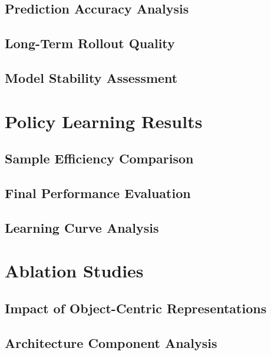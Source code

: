 \documentclass[
	english,
	ruledheaders=section,
	class=report,
	thesis={type=master},
	accentcolor=9c,
	custommargins=true,
	marginpar=false,
	parskip=half-,
	fontsize=11pt,
]{tudapub}
\begin{document}
\subsection{Prediction Accuracy Analysis}
\label{subsec:prediction_accuracy}

\subsection{Long-Term Rollout Quality}
\label{subsec:rollout_quality}

\subsection{Model Stability Assessment}
\label{subsec:stability}

\section{Policy Learning Results}
\label{sec:policy_results}

\subsection{Sample Efficiency Comparison}
\label{subsec:sample_efficiency_comp}

\subsection{Final Performance Evaluation}
\label{subsec:final_performance}

\subsection{Learning Curve Analysis}
\label{subsec:learning_curves}

\section{Ablation Studies}
\label{sec:ablation_studies}

\subsection{Impact of Object-Centric Representations}
\label{subsec:oc_impact}

\subsection{Architecture Component Analysis}
\label{subsec:architecture_analysis}
\end{document}

